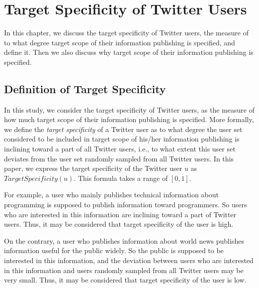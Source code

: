 \section{Target Specificity of Twitter Users}
\label{sec:Target Specificity}

In this chapter, we discuss the target specificity of Twitter users, the
measure of to what degree target scope of their information publishing
is specified, and define it.  Then we also discuss why target scope of
their information publishing is specified.

\subsection{Definition of Target Specificity}
\label{subsec:Definition}

In this study, we consider the target specificity of Twitter users, as
the measure of how much target scope of their information publishing is
specified.  More formally, we define the \emph{target specificity} of a
Twitter user as to what degree the user set considered to be included in
target scope of his/her information publishing is inclining toward a
part of all Twitter users, i.e., to what extent this user set deviates
from the user set randomly sampled from all Twitter users.  In this
paper, we express the target specificity of the Twitter user $u$ as
$\mathit{TargetSpecificity}(u)$. This formula takes a range of $[0, 1]$.

For example, a user who mainly publishes technical information about
programming is supposed to publish information toward programmers.  So
users who are interested in this information are inclining toward a part
of Twitter users.  Thus, it may be considered that target specificity of
the user is high.

On the contrary, a user who publishes information about world news
publishes information useful for the public widely.  So the public is
supposed to be interested in this information, and the deviation between
users who are interested in this information and users randomly sampled
from all Twitter users may be very small.  Thus, it may be considered
that target specificity of the user is low.

